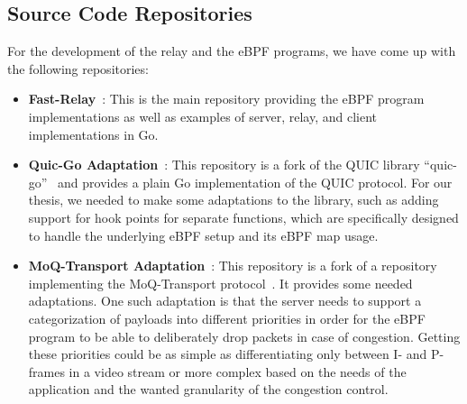 \subsection{Source Code Repositories}\label{sec:source_code_repos}
For the development of the relay and the eBPF programs, we have come up with the following repositories:
\begin{itemize}

    \item \textbf{Fast-Relay}~\parencite{adaptive-moq-repo}:
    This is the main repository providing the eBPF program implementations as well as examples of 
    server, relay, and client implementations in Go.
    
    \item \textbf{Quic-Go Adaptation}~\parencite{quic-go-prio-packs-repo}:
    This repository is a fork of the QUIC library ``quic-go''~\parencite{quic-go-repo} and provides a 
    plain Go implementation of the QUIC protocol.
    For our thesis, we needed to make some adaptations to the library, such as adding support 
    for hook points for separate functions, which are specifically designed to handle the 
    underlying eBPF setup and its eBPF map usage.
    
    \item \textbf{MoQ-Transport Adaptation}~\parencite{priority-moqtransport-repo}:
    This repository is a fork of a repository implementing the MoQ-Transport
    protocol~\parencite{draft-moqtransport}.
    It provides some needed adaptations. 
    One such adaptation is that the server needs to support a 
    categorization of payloads into different priorities in order for the eBPF program to be able to 
    deliberately drop packets in case of congestion.
    Getting these priorities could be as simple as differentiating only between I- and P-frames in a video 
    stream or more complex based on the needs of the application and the wanted granularity of the congestion 
    control.
    
\end{itemize}